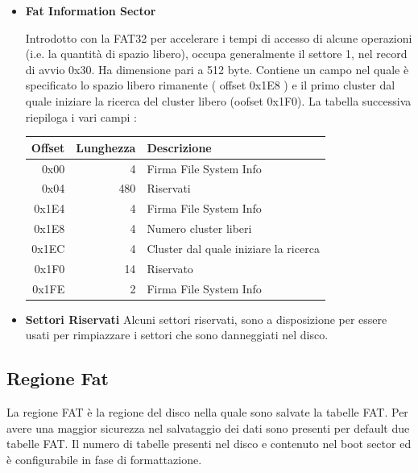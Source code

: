 	  

	     \begin{itemize}
	     \item \textbf{Fat Information Sector}
	  
	      Introdotto con la FAT32 per accelerare i tempi di accesso di alcune operazioni (i.e. la quantità di spazio libero), occupa generalmente il settore 1, nel record di avvio 0x30. Ha dimensione pari a 512 byte. Contiene un campo nel quale è specificato lo spazio libero rimanente ( offset 0x1E8 ) e il primo cluster dal quale iniziare la ricerca del cluster libero (oofset 0x1F0).
	      \newpage
	      La tabella successiva riepiloga i vari campi :
		      \begin{center}
		      \begin{tabular}{|r|r|l|}\hline
			  \textbf {Offset} & \textbf{Lunghezza} & \textbf{Descrizione}\\\hline
			  0x00  & 4  & Firma File System Info\\\hline
			  0x04  & 480&Riservati	\\\hline
			  0x1E4 & 4  & Firma File System Info\\\hline
			  0x1E8 & 4  & Numero cluster liberi \\\hline
			  0x1EC & 4  &  Cluster dal quale iniziare la ricerca \\\hline
			  0x1F0 & 14 &  Riservato \\\hline
			  0x1FE & 2  &  Firma File System Info \\\hline
		      \end{tabular}
		      \end{center}
 	    \end{itemize}
	  

	    \begin{itemize}
	       \item \textbf{Settori Riservati}
	      Alcuni settori riservati, sono a disposizione per essere usati per rimpiazzare i settori che sono danneggiati nel disco. 
	    \end{itemize}

    \subsection{Regione Fat}
	\label{sec:RegioneFat}
	      La regione FAT è la regione del disco nella quale sono salvate la tabelle FAT. Per avere una maggior sicurezza nel salvataggio dei dati sono presenti per default due tabelle FAT. Il numero di tabelle 
	      presenti nel disco e contenuto nel boot sector ed è configurabile in fase di formattazione.
